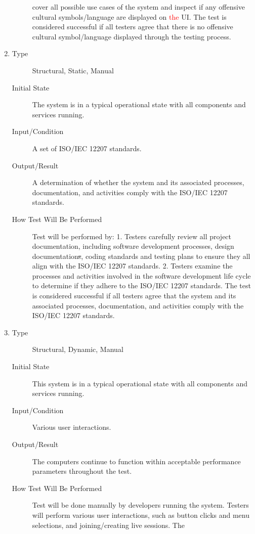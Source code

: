 \documentclass[12pt, titlepage]{article}
\newcommand{\rt}[1]{\textcolor{red}{#1}}
\begin{document}
\begin{enumerate}[NFR-T1]
\begin{description}
    cover all possible use cases of the system and inspect if any offensive
    cultural symbols/language are displayed on \rt{the} UI. The test is considered
    successful if all testers agree that there is no offensive cultural
    symbol/language displayed through the testing process.
  \end{description}
\item \label{NFRT28}
  \begin{description}
  \item[Type] Structural, Static, Manual
  \item[Initial State] The system is in a typical operational state with all
    components and services running.
  \item[Input/Condition] A set of ISO/IEC 12207 standards.
  \item[Output/Result] A determination of whether the system and its associated
    processes, documentation, and activities comply with the ISO/IEC 12207
    standards.
  \item[How Test Will Be Performed] Test will be performed by: 1. Testers
    carefully review all project documentation, including software development
    processes, design documentation\sout{s}, coding standards and testing plans to
    ensure they all align with the ISO/IEC 12207 standards. 2. Testers examine
    the processes and activities involved in the software development life cycle
    to determine if they adhere to the ISO/IEC 12207 standards. The test is
    considered successful if all testers agree that the system and its
    associated processes, documentation, and activities comply with the ISO/IEC
    12207 standards.
  \end{description}
\item \label{NFRT29}
  \begin{description}
  \item[Type] Structural, Dynamic, Manual
  \item[Initial State] This system is in a typical operational state with all
    components and services running.
  \item[Input/Condition] Various user interactions.
  \item[Output/Result] The computers continue to function within acceptable
    performance parameters throughout the test.
  \item[How Test Will Be Performed] Test will be done manually by developers
    running the system. Testers will perform various user interactions, such as
    button clicks and menu selections, and joining/creating live sessions. The

\end{description}
\end{enumerate}
\end{document}
